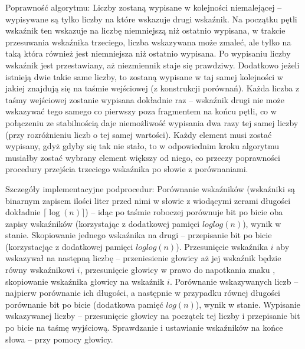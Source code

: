 \documentclass{article}
\begin{document}
Poprawność algorytmu:\newline
Liczby zostaną wypisane w kolejności niemalejącej --
wypisywane są tylko liczby na które wskazuje drugi wskaźnik.
Na początku pętli wskaźnik ten wskazuje na liczbę niemniejszą niż ostatnio wypisana, w trakcie przesuwania wskaźnika trzeciego,
liczba wskazywana może zmaleć, ale tylko na taką która również jest niemniejsza niż ostatnio wypisana.
Po wypisaniu liczby wskaźnik jest przestawiany, aż niezmiennik staje się prawdziwy.
Dodatkowo jeżeli istnieją dwie takie same liczby, to zostaną wypisane w taj samej kolejności w jakiej znajdują się na taśmie wejściowej
(z konstrukcji porównań).\newline
Każda liczba z taśmy wejściowej zostanie wypisana dokładnie raz --
wskaźnik drugi nie może wskazywać tego samego co pierwszy poza fragmentem na końcu pętli,
co w połączeniu ze stabilnością daje niemożliwość wypisania dwa razy tej samej liczby (przy rozróżnieniu liczb o tej samej wartości).
Każdy element musi zostać wypisany, gdyż gdyby się tak nie stało,
to w odpowiednim kroku algorytmu musiałby zostać wybrany element większy od niego,
co przeczy poprawności procedury przejścia trzeciego wskaźnika po słowie z porównaniami.\newline

Szczegóły implementacyjne podprocedur:\newline
Porównanie wskaźników
(wskaźniki są binarnym zapisem ilości liter przed nimi w słowie z wiodącymi zerami długości dokładnie $\lceil\log(n)\rceil$)
-- idąc po taśmie roboczej porównuje bit po bicie oba zapisy wskaźników (korzystając z dodatkowej pamięci $loglog(n)$), wynik w stanie.\newline
Skopiowanie jednego wskaźnika na drugi -- przepisanie bit po bicie (korzystacjąc z dodatkowej pamięci $loglog(n)$).\newline
Przesunięcie wskaźnika $i$ aby wskazywał na następną liczbę -- przeniesienie głowicy aż jej wskaźnik będzie równy wskaźnikowi $i$,
przesunięcie głowicy w prawo do napotkania znaku \officialeuro, skopiowanie wskaźnika głowicy na wskaźnik $i$.\newline
Porównanie wskazywanych liczb -- najpierw porównanie ich długości, a następnie w przypadku równej długości porównanie bit po bicie
(dodatkowa pamięć $log(n)$), wynik w stanie.\newline
Wypisanie wskazywanej liczby -- przesunięcie głowicy na początek tej liczby i przepisanie bit po bicie na taśmę wyjściową.\newline
Sprawdzanie i ustawianie wskaźników na końce słowa -- przy pomocy głowicy.
\end{document}
